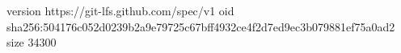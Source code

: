 version https://git-lfs.github.com/spec/v1
oid sha256:504176c052d0239b2a9e79725c67bff4932ce4f2d7ed9ec3b079881ef75a0ad2
size 34300
